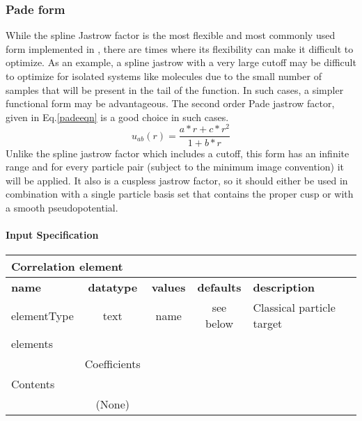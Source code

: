 \subsubsection{Pade form}
\label{sec:onebodyjastrowpade}

While the spline Jastrow factor is the most flexible and most commonly used form implemented in \qmcpack, 
there are times where its flexibility can make it difficult to optimize.  As an example, a spline jastrow
with a very large cutoff may be difficult to optimize for isolated systems like molecules due to the small
number of samples that will be present in the tail of the function.  In such cases, a simpler functional
form may be advantageous.  The second order Pade jastrow factor, given in Eq.\ref{padeeqn} is a good choice 
in such cases.  
\begin{equation}
\label{padeeqn}
u_{ab}(r) = \frac{a*r+c*r^2}{1+b*r}
\end{equation}
Unlike the spline jastrow factor which includes a cutoff, this form has an infinite range and for every particle
pair (subject to the minimum image convention) it will be applied.  It also is a cuspless jastrow factor,
so it should either be used in combination with a single particle basis set that contains the proper cusp or
with a smooth pseudopotential.

\paragraph{Input Specification}
\begin{table}[h]
\begin{center}
\begin{tabular}{l c c c l }
\hline
\multicolumn{5}{l}{Correlation element} \\
\hline
\bfseries name & \bfseries datatype & \bfseries values & \bfseries defaults & \bfseries description \\
\hline
elementType & text & name & see below & Classical particle target  \\
\hline
\multicolumn{5}{l}{elements}\\ \hline
& Coefficients & & & \\ \hline
\multicolumn{5}{l}{Contents}\\ \hline
& (None)  & & &  \\ \hline
\end{tabular}
\end{center}
\end{table}

